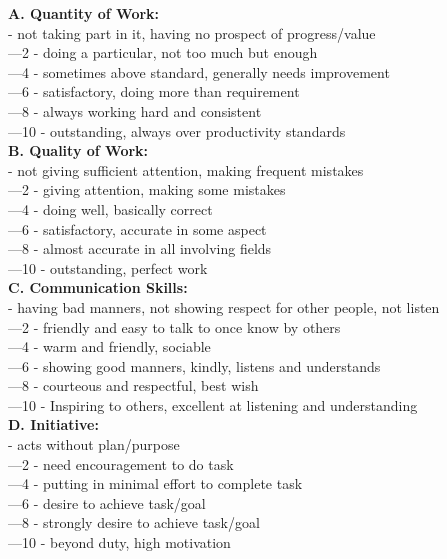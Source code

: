 \documentclass[11pt]{article}
\begin{document}
\textbf{A. Quantity of Work:}\\
	\indent{}	- not taking part in it, having no prospect of progress/value \\
	\indent{}—2	- doing a particular, not too much but enough\\
	\indent{}—4	- sometimes above standard, generally needs improvement \\
	\indent{}—6	- satisfactory, doing more than requirement \\
	\indent{}—8	- always working hard and consistent \\
	\indent{}—10	- outstanding, always over productivity standards \\

\textbf{B. Quality of Work:}\\
	\indent{}	- not giving sufficient attention, making frequent mistakes\\
	\indent{}—2	- giving attention, making some mistakes\\
	\indent{}—4	- doing well, basically correct\\
	\indent{}—6	- satisfactory, accurate in some aspect\\
	\indent{}—8	- almost accurate in all involving fields\\
	\indent{}—10	- outstanding, perfect work\\

\textbf{C. Communication Skills:}\\
	\indent{}	- having bad manners, not showing respect for other people, not listen\\
	\indent{}—2	- friendly and easy to talk to once know by others\\
	\indent{}—4	- warm and friendly, sociable\\
	\indent{}—6	- showing good manners, kindly, listens and understands\\
	\indent{}—8	- courteous and respectful, best wish\\ 
	\indent{}—10	- Inspiring to others, excellent at listening and understanding\\

\textbf{D. Initiative:}\\
	\indent{}	- acts without plan/purpose\\
	\indent{}—2	- need encouragement to do task\\
	\indent{}—4	- putting in minimal effort to complete task\\
	\indent{}—6	- desire to achieve task/goal\\
	\indent{}—8	- strongly desire to achieve task/goal\\
	\indent{}—10	- beyond duty, high motivation\\
\end{document}
